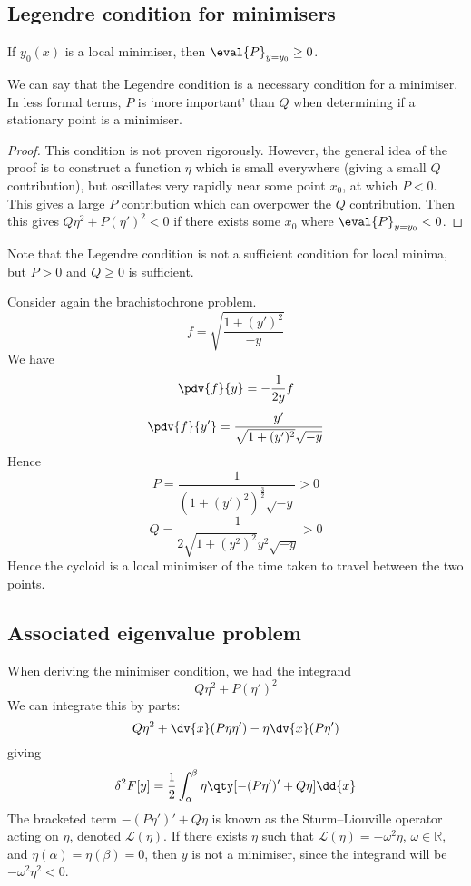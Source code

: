 \subsection{Legendre condition for minimisers}
\begin{proposition}
	If \( y_0(x) \) is a local minimiser, then \( \eval{P}_{y=y_0} \geq 0 \).
\end{proposition}
We can say that the Legendre condition is a necessary condition for a minimiser.
In less formal terms, \( P \) is `more important' than \( Q \) when determining if a stationary point is a minimiser.
\begin{proof}
	This condition is not proven rigorously.
	However, the general idea of the proof is to construct a function \( \eta \) which is small everywhere (giving a small \( Q \) contribution), but oscillates very rapidly near some point \( x_0 \), at which \( P < 0 \).
	This gives a large \( P \) contribution which can overpower the \( Q \) contribution.
	Then this gives \( Q\eta^2 + P(\eta')^2 < 0 \) if there exists some \( x_0 \) where \( \eval{P}_{y=y_0} < 0 \).
\end{proof}

Note that the Legendre condition is not a sufficient condition for local minima, but \( P > 0 \) and \( Q \geq 0 \) is sufficient.

\begin{example}
	Consider again the brachistochrone problem.
	\[
		f = \sqrt{\frac{1 + (y')^2}{-y}}
	\]
	We have
	\[
		\pdv{f}{y} = -\frac{1}{2y}f
	\]
	\[
		\pdv{f}{y'} = \frac{y'}{\sqrt{1+(y')^2}\sqrt{-y}}
	\]
	Hence
	\[
		P = \frac{1}{(1+(y')^2)^\frac{3}{2} \sqrt{-y}} > 0
	\]
	\[
		Q = \frac{1}{2\sqrt{1 + (y^2)^2}y^2 \sqrt{-y}} > 0
	\]
	Hence the cycloid is a local minimiser of the time taken to travel between the two points.
\end{example}

\subsection{Associated eigenvalue problem}
When deriving the minimiser condition, we had the integrand
\[
	Q\eta^2 + P(\eta')^2
\]
We can integrate this by parts:
\[
	Q\eta^2 + \dv{x} (P \eta \eta') - \eta \dv{x} (P \eta')
\]
giving
\[
	\delta^2 F[y] = \frac{1}{2}\int_\alpha^\beta \eta \qty[-(P\eta')' + Q\eta]\dd{x}
\]
The bracketed term \( -(P\eta')' + Q\eta \) is known as the Sturm--Liouville operator acting on \( \eta \), denoted \( \mathcal L(\eta) \).
If there exists \( \eta \) such that \( \mathcal L(\eta) = -\omega^2\eta \), \( \omega \in \mathbb R\), and \( \eta(\alpha) = \eta(\beta) = 0 \), then \( y \) is not a minimiser, since the integrand will be \( -\omega^2\eta^2 < 0 \).

